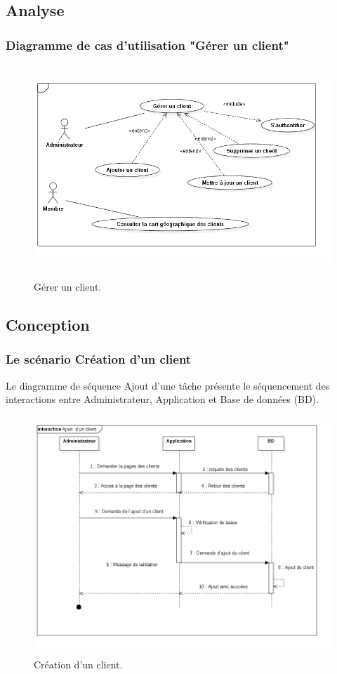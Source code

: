 
\subsection{Analyse}
\subsubsection{ Diagramme de cas d'utilisation "G\'{e}rer un client"}
\begin{figure}[H]
\center
\includegraphics[width=13cm,height=8cm]{./figures/ucC.png}
\caption{G\'{e}rer un client.}
\end{figure}

\subsection{Conception}
\subsubsection{Le sc\'{e}nario \guillemotleft{} Cr\'{e}ation d'un client\guillemotright{}}
Le diagramme de s\'{e}quence \guillemotleft{} Ajout d'une t\^{a}che \guillemotright{} pr\'{e}sente le s\'{e}quencement
des interactions entre Administrateur, Application et Base de donn\'{e}es (BD).

\begin{figure}[H]
\center
\includegraphics[width=14cm,height=9cm]{./figures/seq/F.png}
\caption{Cr\'{e}ation d'un client.}
\end{figure}



